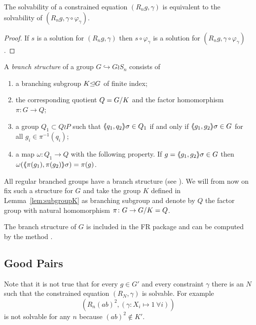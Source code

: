 \documentclass[a4paper,11pt]{amsart}
\begin{document}
\begin{lem} \label{lem:solvabilityWithReducedConstraint}
 The solvability of a constrained equation $(R_n g,\gamma)$ is equivalent to the 
 solvability of $(R_n g,\gamma\circ \varphi_\gamma)$.
\end{lem}
 \begin{proof}
 If $s$ is a solution for $(R_n g,\gamma)$ then $s\circ \varphi_\gamma$ is
 a solution for $(R_n g,\gamma\circ \varphi_\gamma)$. 
\end{proof}


\begin{defi} 
A \emph{branch structure} of a group $G\hookrightarrow G \wr S_n$ consists of  
\begin{enumerate}
 \item a branching subgroup $K{\mathrel\trianglelefteq} G$ of finite index;
 \item the corresponding quotient $Q={G/K}$ and the factor homomorphism $\pi\colon G \to Q$;
 \item a group $Q_1 \subset Q \wr P$ such that $\langle\negthickspace\langle q_1,q_2\rangle\negthickspace\rangle\sigma\in Q_1$ if
	and only if $\langle\negthickspace\langle g_1,g_2\rangle\negthickspace\rangle\sigma \in G$ for all $g_i \in \pi^{-1}(q_i)$;
 \item a map $\omega\colon Q_1 \to Q$ with the following property. If 
      $g=\langle\negthickspace\langle g_1,g_2\rangle\negthickspace\rangle\sigma \in G$ then $\omega(\langle\negthickspace\langle\pi(g_1),\pi(g_2)\rangle\negthickspace\rangle\sigma) = \pi(g)$.
\end{enumerate}
\end{defi}
All regular branched groups have a branch structure
(see {\cite[Remark after Definition~5.1]{Bartholdi:RepresentationZetaFunctions}}).
We will from now on fix such a structure for $G$ and take 
the group $K$ defined in Lemma~\ref{lem:subgroupK} as branching subgroup and 
denote by $Q$ the factor group with natural homomorphism $\pi\colon G \to {G/K}=Q$.

 The branch structure of $G$ is included in the FR package and can be computed by the method
  .

\subsection{Good Pairs}\label{sec:good_pairs}
Note that 
 it is not true that for every $g\in G'$ and every constraint $\gamma$ 
 there is an $N$ such that the constrained equation $(R_N,\gamma)$ is solvable. For example 
 \[\left(R_n(ab)^2,(\gamma\colon X_i\mapsto 1\ \forall i)\right)\] 
 is not solvable for any $n$ because $(ab)^2\notin K'$.
\end{document}
